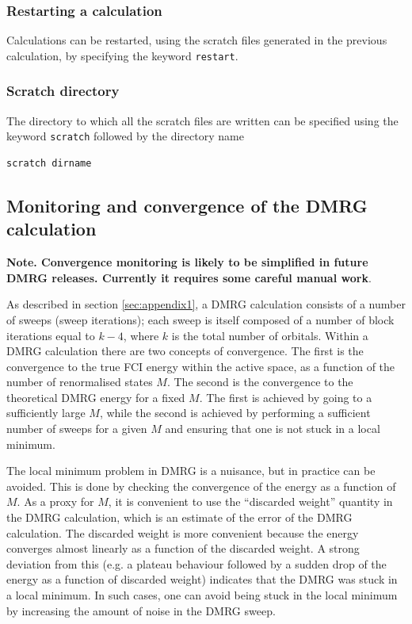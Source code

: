 \documentclass[letterpaper,12pt,aps, pra]{revtex4-1}
\begin{document}
\subsubsection{Restarting a calculation}
 Calculations can be restarted, using the scratch files generated in the previous calculation, by specifying the keyword \texttt{restart}.

\subsubsection{Scratch directory}
The directory to which all the scratch files are written can be specified using the keyword \texttt{scratch}  followed by the directory name
\begin{verbatim}
scratch dirname
\end{verbatim}

\subsection{Monitoring and convergence of the DMRG calculation}

\label{sec:dmrg_convergence}

{\bf Note. Convergence monitoring is likely to be simplified in future DMRG releases. Currently
it requires some careful manual work}.

As described in section \ref{sec:appendix1}, a DMRG calculation consists of a number of sweeps (sweep iterations); each sweep
is itself composed of a number of block iterations equal to $k-4$, where $k$ is the total number of orbitals. Within a DMRG calculation
there are two concepts of convergence. The first is the convergence to the true FCI energy within the active space, as a function
of the number of renormalised states $M$. The second is the convergence to the theoretical DMRG energy for a fixed $M$. The
first is achieved by going to a sufficiently large $M$, while the second is achieved by performing a sufficient number of sweeps for a given $M$ and ensuring
that one is not stuck in a local minimum.

The local minimum problem in DMRG is a nuisance, but in practice can be avoided.
This is done by checking the convergence of the energy as a function of $M$. 
As a proxy for $M$, it is convenient to use the ``discarded weight'' quantity in the DMRG calculation, which is an
estimate of the error of the DMRG calculation. The discarded weight is more convenient because the energy converges
almost linearly as a function of the discarded weight. A strong deviation from this (e.g. a plateau behaviour followed by a sudden drop 
of the energy as a function of discarded weight) indicates that the DMRG was stuck in a local minimum. In such cases,
one can avoid being stuck in the local minimum by increasing the amount of noise in the DMRG sweep.
\end{document}
